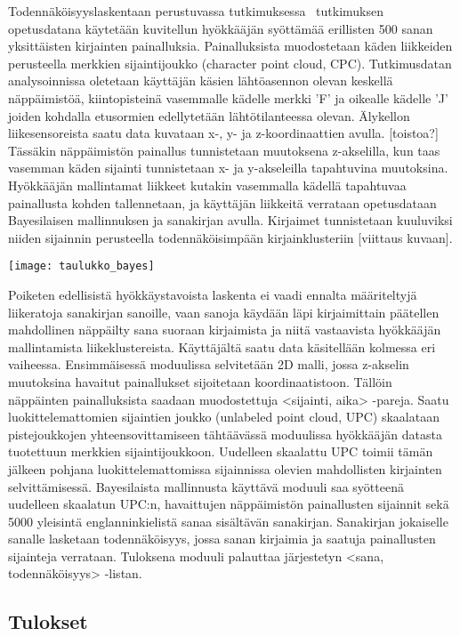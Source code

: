 \documentclass[finnish]{tktltiki2}
\theoremstyle{definition}
\theoremstyle{remark}
\begin{document}
Todennäköisyyslaskentaan perustuvassa tutkimuksessa~\cite{mole} tutkimuksen opetusdatana käytetään kuvitellun hyökkääjän syöttämää erillisten 500 sanan yksittäisten kirjainten painalluksia. Painalluksista muodostetaan käden liikkeiden perusteella merkkien sijaintijoukko (character point cloud, CPC). Tutkimusdatan analysoinnissa oletetaan käyttäjän käsien lähtöasennon olevan keskellä näppäimistöä, kiintopisteinä vasemmalle kädelle merkki 'F' ja oikealle kädelle 'J' joiden kohdalla etusormien edellytetään lähtötilanteessa olevan. Älykellon liikesensoreista saatu data kuvataan x-, y- ja z-koordinaattien avulla. [toistoa?] Tässäkin näppäimistön painallus tunnistetaan muutoksena z-akselilla, kun taas vasemman käden sijainti tunnistetaan x- ja y-akseleilla tapahtuvina muutoksina. Hyökkääjän mallintamat liikkeet kutakin vasemmalla kädellä tapahtuvaa painallusta kohden tallennetaan, ja käyttäjän liikkeitä verrataan opetusdataan Bayesilaisen mallinnuksen ja sanakirjan avulla. Kirjaimet tunnistetaan kuuluviksi niiden sijainnin perusteella todennäköisimpään kirjainklusteriin [viittaus kuvaan].

\texttt{[image: taulukko\_bayes]}

Poiketen edellisistä hyökkäystavoista laskenta ei vaadi ennalta määriteltyjä liikeratoja sanakirjan sanoille, vaan sanoja käydään läpi kirjaimittain päätellen mahdollinen näppäilty sana suoraan kirjaimista ja niitä vastaavista hyökkääjän mallintamista liikeklustereista. 
Käyttäjältä saatu data käsitellään kolmessa eri vaiheessa. Ensimmäisessä moduulissa selvitetään 2D malli, jossa z-akselin muutoksina havaitut painallukset sijoitetaan koordinaatistoon. Tällöin näppäinten painalluksista saadaan muodostettuja <sijainti, aika> -pareja. Saatu luokittelemattomien sijaintien joukko (unlabeled point cloud, UPC) skaalataan pistejoukkojen yhteensovittamiseen tähtäävässä moduulissa hyökkääjän datasta tuotettuun merkkien sijaintijoukkoon. Uudelleen skaalattu UPC toimii tämän jälkeen pohjana luokittelemattomissa sijainnissa olevien mahdollisten kirjainten selvittämisessä. 
Bayesilaista mallinnusta käyttävä moduuli saa syötteenä uudelleen skaalatun UPC:n, havaittujen näppäimistön painallusten sijainnit sekä 5000 yleisintä englanninkielistä sanaa sisältävän sanakirjan. Sanakirjan jokaiselle sanalle lasketaan todennäköisyys, jossa sanan kirjaimia ja saatuja painallusten sijainteja verrataan. Tuloksena moduuli palauttaa järjestetyn <sana, todennäköisyys> -listan.

\subsection{Tulokset}
\end{document}
